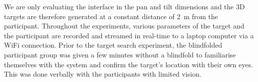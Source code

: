 \documentclass[sigconf, review=true, screen=true, anonymous=true]{acmart}
\begin{document}
We are only evaluating the interface in the pan and tilt dimensions and the 3D targets are therefore generated at a constant distance of \SI{2}{\metre} from the participant.
Throughout the experiments, various parameters of the target and the participant are recorded and streamed in real-time to a laptop computer via a WiFi connection.
Prior to the target search experiment, the blindfolded participant group was given a few minutes without a blindfold to familiarise themselves with the system and confirm the target's location with their own eyes.
This was done verbally with the participants with limited vision. 




\end{document}
